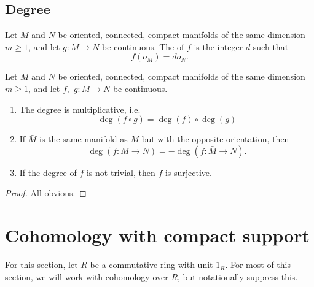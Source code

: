 \documentclass[main.tex]{subfiles}
\begin{document}
\subsection{Degree}
\label{ssc:degree}

\begin{definition}[degree]
  \label{def:degree}
  Let \(M\) and \(N\) be oriented, connected, compact manifolds of the same dimension \(m \geq 1\), and let \(g\colon M \to N\) be continuous. The  of \(f\) is the integer \(d\) such that
  \begin{equation*}
    f(o_{M}) = d o_{N}.
  \end{equation*}
\end{definition}

\begin{proposition}
  Let \(M\) and \(N\) be oriented, connected, compact manifolds of the same dimension \(m \geq 1\), and let \(f,\) \(g\colon M \to N\) be continuous.
  \begin{enumerate}
    \item The degree is multiplicative, i.e.
      \begin{equation*}
        \deg(f \circ g) = \deg(f) \circ \deg(g)
      \end{equation*}

    \item If \(\bar{M}\) is the same manifold as \(M\) but with the opposite orientation, then
      \begin{equation*}
        \deg (f\colon M \to N) = - \deg(f\colon \bar{M} \to N).
      \end{equation*}

    \item If the degree of \(f\) is not trivial, then \(f\) is surjective.
  \end{enumerate}
\end{proposition}
\begin{proof}
  All obvious.
\end{proof}

\section{Cohomology with compact support}
\label{sec:cohomology_with_compact_support}

For this section, let \(R\) be a commutative ring with unit \(1_{R}\). For most of this section, we will work with cohomology over \(R\), but notationally suppress this.
\end{document}
